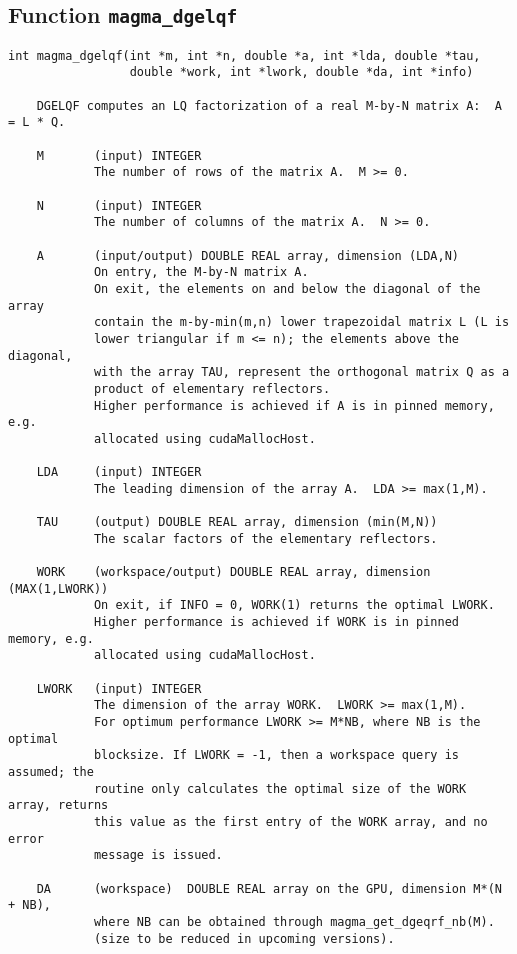 \documentclass[10pt]{book}
\begin{document}
\subsection{Function {\tt {\bf magma\_dgelqf}}}
\begin{verbatim}
int magma_dgelqf(int *m, int *n, double *a, int *lda, double *tau,
                 double *work, int *lwork, double *da, int *info)

    DGELQF computes an LQ factorization of a real M-by-N matrix A:  A = L * Q.

    M       (input) INTEGER
            The number of rows of the matrix A.  M >= 0.

    N       (input) INTEGER
            The number of columns of the matrix A.  N >= 0.

    A       (input/output) DOUBLE REAL array, dimension (LDA,N)
            On entry, the M-by-N matrix A.
            On exit, the elements on and below the diagonal of the array
            contain the m-by-min(m,n) lower trapezoidal matrix L (L is
            lower triangular if m <= n); the elements above the diagonal,
            with the array TAU, represent the orthogonal matrix Q as a
            product of elementary reflectors.
            Higher performance is achieved if A is in pinned memory, e.g.
            allocated using cudaMallocHost.

    LDA     (input) INTEGER
            The leading dimension of the array A.  LDA >= max(1,M).

    TAU     (output) DOUBLE REAL array, dimension (min(M,N))
            The scalar factors of the elementary reflectors.

    WORK    (workspace/output) DOUBLE REAL array, dimension (MAX(1,LWORK))
            On exit, if INFO = 0, WORK(1) returns the optimal LWORK.
            Higher performance is achieved if WORK is in pinned memory, e.g.
            allocated using cudaMallocHost.

    LWORK   (input) INTEGER
            The dimension of the array WORK.  LWORK >= max(1,M).
            For optimum performance LWORK >= M*NB, where NB is the optimal 
            blocksize. If LWORK = -1, then a workspace query is assumed; the 
            routine only calculates the optimal size of the WORK array, returns
            this value as the first entry of the WORK array, and no error
            message is issued.

    DA      (workspace)  DOUBLE REAL array on the GPU, dimension M*(N + NB),
            where NB can be obtained through magma_get_dgeqrf_nb(M).
            (size to be reduced in upcoming versions).


\end{verbatim}
\end{document}

